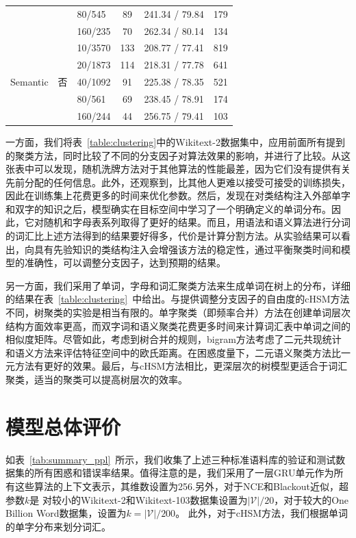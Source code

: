 \begin{table}[!t]
\begin{tabular}{lclccc}
    &&80/545 &89&241.34 / 79.84&179\\
    &&160/235 &70&262.34 / 80.14&134\\
  \midrule
  \multirow{5}{*}{Semantic}  &\multirow{5}{*}{否} &10/3570 &133&208.77 / 77.41&819\\
    & &20/1873 &114&218.31 / 77.78&641\\
    & &40/1092 &91&225.38 / 78.35&521\\
    & &80/561 &69&238.45 / 78.91&174\\
    & &160/244 &44&256.75 / 79.41&103\\
\bottomrule
  \end{tabular}
\end{table}

一方面，我们将表~\ref{table:clustering}中的Wikitext-2数据集中，应用前面所有提到的聚类方法，同时比较了不同的分支因子对算法效果的影响，并进行了比较。从这张表中可以发现，随机洗牌方法对于其他算法的性能最差，因为它们没有提供有关先前分配的任何信息。此外，还观察到，比其他人更难以接受可接受的训练损失，因此在训练集上花费更多的时间来优化参数。然后，发现在对类结构注入外部单字和双字的知识之后，模型确实在目标空间中学习了一个明确定义的单词分布。因此，它对随机和字母表系列取得了更好的结果。而且，用语法和语义算法进行分词的词汇比上述方法得到的结果要好得多，代价是计算分割方法。从实验结果可以看出，向具有先验知识的类结构注入会增强该方法的稳定性，通过平衡聚类时间和模型的准确性，可以调整分支因子，达到预期的结果。



另一方面，我们采用了单词，字母和词汇聚类方法来生成单词在树上的分布，详细的结果在表~\ref{table:clustering}~中给出。与提供调整分支因子的自由度的cHSM方法不同，树聚类的实验是相当有限的。单字聚类（即频率合并）方法在创建单词层次结构方面效率更高，而双字词和语义聚类花费更多时间来计算词汇表中单词之间的相似度矩阵。尽管如此，考虑到树合并的规则，bigram方法考虑了二元共现统计和语义方法来评估特征空间中的欧氏距离。在困惑度量下，二元语义聚类方法比一元方法有更好的效果。最后，与cHSM方法相比，更深层次的树模型更适合于词汇聚类，适当的聚类可以提高树层次的效率。

\section{模型总体评价}
如表~\ref{tab:summary_ppl}~所示，我们收集了上述三种标准语料库的验证和测试数据集的所有困惑和错误率结果。值得注意的是，我们采用了一层GRU单元作为所有这些算法的上下文表示，其维数设置为256.另外，对于NCE和Blackout近似，超参数$ k $是 对较小的Wikitext-2和Wikitext-103数据集设置为$\mathcal{|V|}/20 $，对于较大的One Billion Word数据集，设置为$ k = | \mathcal{V} | / 200 $。 此外，对于cHSM方法，我们根据单词的单字分布来划分词汇。

